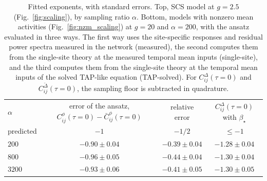 \begin{table}[t]
\centering
\caption{Fitted exponents, with standard errors. Top, SCS model at $g = 2.5$ (Fig.~\ref{fig:scaling}), by sampling ratio $\alpha$. Bottom, models with nonzero mean activities (Fig.~\ref{fig:nzm_scaling}) at $g = 20$ and $\alpha = 200$, with the ansatz evaluated in three ways. The first way uses the site-specific responses and residual power spectra measured in the network (measured), the second computes them from the single-site theory at the measured temporal mean inputs (single-site), and the third computes them from the single-site theory at the temporal mean inputs of the solved TAP-like equation (TAP-solved). For $C^\Delta_{ij}(\tau = 0)$ and $C^{\breve{\Delta}}_{ij}(\tau = 0)$, the sampling floor is subtracted in quadrature.}
\label{tab:exponents}
\begin{tabular}{@{}lccc@{}}
\toprule
$\alpha$ & error of the ansatz, $C^\phi_{ij}(\tau = 0) - \bar{C}^\phi_{ij}(\tau = 0)$ & relative error & $C^\Delta_{ij}(\tau = 0)$ with $\beta_\star$ \\
predicted & $-1$ & $-1/2$ & $\leq -1$ \\
\midrule
$200$ & $-0.90 \pm 0.04$ & $-0.39 \pm 0.04$ & $-1.28 \pm 0.04$ \\
$800$ & $-0.96 \pm 0.05$ & $-0.44 \pm 0.04$ & $-1.30 \pm 0.04$ \\
$3200$ & $-0.93 \pm 0.06$ & $-0.41 \pm 0.05$ & $-1.30 \pm 0.05$ \\
\bottomrule
\end{tabular}

\vspace{1em}


\end{table}
